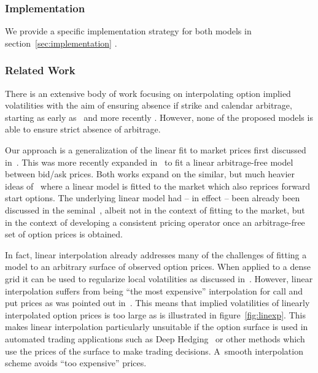 \documentclass[twoside]{article}
\theoremstyle{plain}
\theoremstyle{definition}
\theoremstyle{remark}
\begin{document}
\subsubsection*{Implementation}

We provide a specific implementation strategy for both models in section~\ref{sec:implementation} .

\subsubsection*{Related Work}

There is an extensive body of work focusing on interpolating option implied volatilities with the aim of 
ensuring absence if strike and calendar arbitrage, starting as early as~\cite{estimatingimpliedMayhew}
and more recently
\cite{impliedvolsplinesBliss, fengler2009, deschâtres2026}. However,
none of the proposed models is able to ensure strict absence of arbitrage. 

Our approach is a generalization of the linear fit
to market prices first discussed in~\cite{DLV}.
This was more recently expanded in~\cite{cohen2020detecting, cohenreisingerwang2020}
to fit a linear arbitrage-free model between bid/ask prices. 
Both works expand on the similar, but much heavier
ideas of~\cite{buehler2006expensive} where a linear model is fitted to the market which also
reprices forward start options. The underlying linear model had -- in effect -- been already
been discussed in the seminal~\cite{Andersen1997TheEO, AndersenHugeDML},
albeit not in the context of fitting to the market, but
in the context of developing a consistent pricing operator once an arbitrage-free set of option prices is obtained.

In fact, linear interpolation already addresses many of the challenges of fitting a model to an arbitrary surface of observed option prices.
When applied to a dense grid it can be used to regularize local volatilities as discussed in~\cite{DLV}.
However, linear interpolation suffers from being ``the most expensive'' interpolation for call and put prices as
was pointed out in~\cite{buehler2006expensive}. This means that implied volatilities of linearly interpolated
option prices is too large as is illustrated in figure~\ref{fig:linexp}. This makes linear interpolation particularly
unsuitable if the option surface is used in automated trading applications such as Deep Hedging~\cite{DH} 
or other methods which use the prices of the surface to make trading decisions.
A~smooth interpolation scheme
avoids ``too expensive'' prices.
\end{document}
